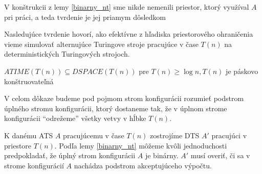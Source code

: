 \begin{dokaz}
  V konštrukcii z lemy \ref{binarny_nt} sme nikde nemenili priestor,
  ktorý využíval $A$ pri práci, a teda tvrdenie je jej priamym
  dôsledkom
\end{dokaz}

Nasledujúce tvrdenie hovorí, ako efektívne z hľadiska
priestorového ohraničenia vieme simulovať alternujúce Turingove
stroje pracujúce v čase $T(n)$ na deterministických Turingových
strojoch.

\begin{veta}
  \label{atimedspace} $ATIME(T(n))\subseteq DSPACE(T(n))$ pre
  $T(n)\geq\log n, T(n)$ je páskovo konštruovateľná
\end{veta}

\begin{dokaz}
  V celom dôkaze budeme pod pojmom strom konfigurácii rozumieť
  podstrom úplného stromu konfigurácii, ktorý dostaneme tak, že v
  úplnom strome konfigurácii ``odrežeme'' všetky vetvy v hĺbke
  $T(n)$.

  \smallskip
  K danému ATS $A$ pracujúcemu v čase $T(n)$ zostrojíme DTS $A'$
  pracujúci v priestore $T(n)$. Podľa lemy \ref{binarny_nt} môžeme
  kvôli jednoduchosti predpokladať, že úplný strom konfigurácii $A$
  je binárny. $A'$ musí overiť, či sa v strome konfigurácií $A$
  nachádza podstrom akceptujúceho výpočtu.


\end{dokaz}

